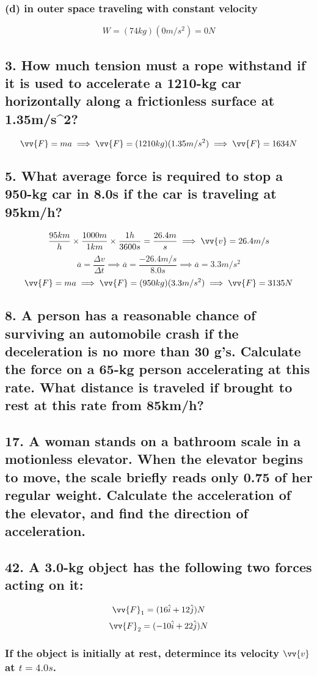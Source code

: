 \documentclass[12pt,a4paper,english]{article}
\begin{document}
\begin{flushleft}
  \subsubsection{(d) in outer space traveling with constant velocity}
  \[
    W=(74kg)(0m/s^2)=0N
  \]
  \subsection{3. How much tension must a rope withstand if it is used to accelerate a 1210-kg car horizontally along a frictionless surface at 1.35m/s^2?}
  \[
    \vv{F}=ma\implies
    \vv{F}=(1210kg)(1.35m/s^2)\implies
    \vv{F}=1634N
  \]
  \subsection{5. What average force is required to stop a 950-kg car in 8.0s if the car is traveling at 95km/h?}
  \[
    \frac{95km}{h}\times\frac{1000m}{1km}\times\frac{1h}{3600s}=
    \frac{26.4m}{s}\implies
    \vv{v}=26.4m/s
  \]
  \[
    \overline{a}=\frac{\Delta v}{\Delta t}\implies
    \overline{a}=\frac{-26.4m/s}{8.0s}\implies
    \overline{a}=3.3m/s^2
  \]
  \[
    \vv{F}=ma\implies
    \vv{F}=(950kg)(3.3m/s^2)\implies
    \vv{F}=3135N
  \]
  \subsection{8. A person has a reasonable chance of surviving an automobile crash if the deceleration is no more than 30 g's. Calculate the force on a 65-kg person accelerating at this rate. What distance is traveled if brought to rest at this rate from 85km/h?}
  \subsection{17. A woman stands on a bathroom scale in a motionless elevator. When the elevator begins to move, the scale briefly reads only 0.75 of her regular weight. Calculate the acceleration of the elevator, and find the direction of acceleration.}
  \subsection{42. A 3.0-kg object has the following two forces acting on it:}
  \[
    \vv{F}_1=(16\hat{i}+12\hat{j})N
  \]
  \[
    \vv{F}_2=(-10\hat{i}+22\hat{j})N
  \]
  \subsubsection{If the object is initially at rest, determince its velocity $\vv{v}$ at $t=4.0s$.}

\end{flushleft}
\end{document}

